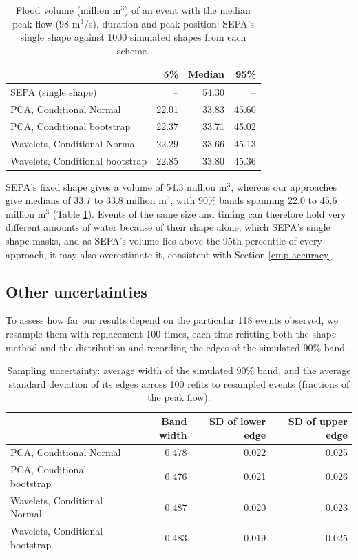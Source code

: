 \documentclass[
  11pt,
  a4paper]{article}
\begin{document}
\begin{table}[!h]
\centering
\caption{\label{tab:volumes}Flood volume (million m$^3$) of an event with the median peak flow (98 m$^3$/s), duration and peak position: SEPA's single shape against 1000 simulated shapes from each scheme.}
\centering
\fontsize{9}{11}\selectfont
\begin{tabular}[t]{lrrr}
\toprule
 & 5\% & Median & 95\%\\
\midrule
SEPA (single shape) & -- & 54.30 & --\\
PCA, Conditional Normal & 22.01 & 33.83 & 45.60\\
PCA, Conditional bootstrap & 22.37 & 33.71 & 45.02\\
Wavelets, Conditional Normal & 22.29 & 33.66 & 45.13\\
Wavelets, Conditional bootstrap & 22.85 & 33.80 & 45.36\\
\bottomrule
\end{tabular}
\end{table}

SEPA's fixed shape gives a volume of 54.3 million \(\text{m}^3\), whereas our approaches give medians of 33.7 to 33.8 million \(\text{m}^3\), with 90\% bands spanning 22.0 to 45.6 million \(\text{m}^3\) (Table \ref{tab:volumes}). Events of the same size and timing can therefore hold very different amounts of water because of their shape alone, which SEPA's single shape masks, and as SEPA's volume lies above the 95th percentile of every approach, it may also overestimate it, consistent with Section \ref{cmp-accuracy}.

\subsection{Other uncertainties}\label{other-uncertainties}

To assess how far our results depend on the particular 118 events observed, we resample them with replacement 100 times, each time refitting both the shape method and the distribution and recording the edges of the simulated 90\% band.

\begin{table}[!h]
\centering
\caption{\label{tab:sampling}Sampling uncertainty: average width of the simulated 90\% band, and the average standard deviation of its edges across 100 refits to resampled events (fractions of the peak flow).}
\centering
\fontsize{9}{11}\selectfont
\begin{tabular}[t]{lrrr}
\toprule
 & Band width & SD of lower edge & SD of upper edge\\
\midrule
PCA, Conditional Normal & 0.478 & 0.022 & 0.025\\
PCA, Conditional bootstrap & 0.476 & 0.021 & 0.026\\
Wavelets, Conditional Normal & 0.487 & 0.020 & 0.023\\
Wavelets, Conditional bootstrap & 0.483 & 0.019 & 0.025\\
\bottomrule
\end{tabular}
\end{table}
\end{document}
